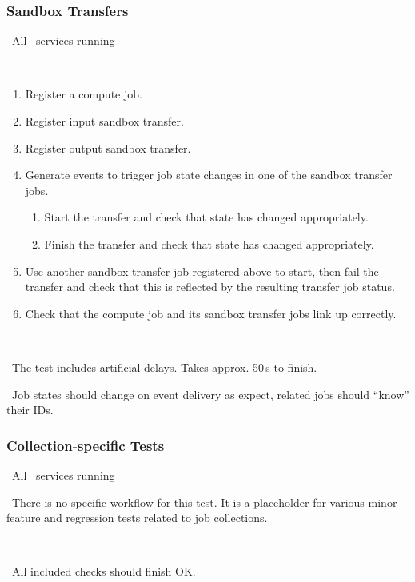 \subsubsection{Sandbox Transfers}

\req\ All \LB\ services running

\what\
\begin{enumerate}
\item Register a compute job.
\item Register input sandbox transfer.
\item Register output sandbox transfer.
\item Generate events to trigger job state changes in one of the sandbox transfer jobs.
	\begin{enumerate}
        \item Start the transfer and check that state has changed appropriately.
        \item Finish the transfer and check that state has changed appropriately. 
	\end{enumerate}
\item Use another sandbox transfer job registered above to start, then fail the transfer and check that this is reflected by the resulting transfer job status. 
\item Check that the compute job and its sandbox transfer jobs link up correctly. 

\end{enumerate}

\how\ 

\note\ The test includes artificial delays. Takes approx. 50\,s to finish.

\result\ Job states should change on event delivery as expect, related jobs should ``know'' their IDs.


\subsubsection{Collection-specific Tests}

\req\ All \LB\ services running

\what\
There is no specific workflow for this test. It is a placeholder for various minor feature and regression tests related to job collections.

\how\ \ctblb{lb-test-collections.sh}

\result\ All included checks should finish OK.





